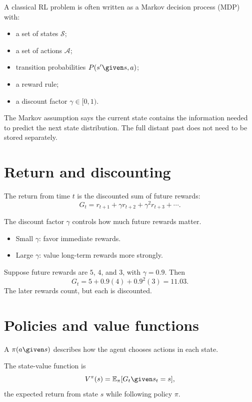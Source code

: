 A classical RL problem is often written as a Markov decision process (MDP) with:

\begin{itemize}
  \item a set of states $\mathcal{S}$;
  \item a set of actions $\mathcal{A}$;
  \item transition probabilities $P(s'\given s,a)$;
  \item a reward rule;
  \item a discount factor $\gamma\in[0,1)$.
\end{itemize}

The Markov assumption says the current state contains the information needed to predict the next state distribution. The full distant past does not need to be stored separately.

\section{Return and discounting}

The return from time $t$ is the discounted sum of future rewards:
\[
  G_t=r_{t+1}+\gamma r_{t+2}+\gamma^2r_{t+3}+\cdots.
\]

The discount factor $\gamma$ controls how much future rewards matter.

\begin{itemize}
  \item Small $\gamma$: favor immediate rewards.
  \item Large $\gamma$: value long-term rewards more strongly.
\end{itemize}

\begin{workedexample}
Suppose future rewards are $5$, $4$, and $3$, with $\gamma=0.9$. Then
\[
G_t=5+0.9(4)+0.9^2(3)=11.03.
\]
The later rewards count, but each is discounted.
\end{workedexample}

\section{Policies and value functions}

A  $\pi(a\given s)$ describes how the agent chooses actions in each state.

The state-value function is
\[
  V^{\pi}(s)=\mathbb{E}_{\pi}[G_t\given s_t=s],
\]
the expected return from state $s$ while following policy $\pi$.

